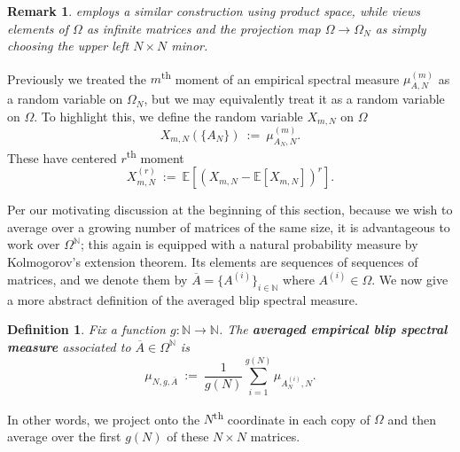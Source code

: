 \documentclass[11pt,reqno]{amsart}
\newcommand{\fix}[1]{\textcolor{red}{\textbf{ (#1)\normalsize}}}
\numberwithin{equation}{section}
\newtheorem{defi}[thm]{Definition}
\theoremstyle{plain}
\newtheorem{rem}[thm]{Remark}
\newcommand{\N}{\mathbb{N}}
\newcommand{\E}[1]{\mathbb{E}[#1]}
\begin{document}
\begin{rem}
\cite{Block Circulant} employs a similar construction using product space, while \cite{Toeplitz} views elements of $\Omega$ as infinite matrices and the projection map $\Omega \rightarrow \Omega_N$ as simply choosing the upper left $N \times N$ minor.
\end{rem}

Previously we treated the $m$\textsuperscript{th} moment of an empirical spectral measure $\mu_{A,N}^{(m)}$ as a random variable on $\Omega_N$, but we may equivalently treat it as a random variable on $\Omega$. To highlight this, we define the random variable $X_{m,N}$ on $\Omega$
\begin{equation}\label{eq_xmn}
X_{m,N}(\{A_N\})\ :=\ \mu_{A_N,N}^{(m)}.
\end{equation}
These have centered $r$\textsuperscript{th} moment
\begin{equation}
X_{m,N}^{(r)}\ :=\ \E{(X_{m,N}-\E{X_{m,N}})^r}.
\end{equation}

Per our motivating discussion at the beginning of this section, because we wish to average over a growing number of matrices of the same size, it is advantageous to work over $\Omega^\N$; this again is equipped with a natural probability measure by Kolmogorov's extension theorem. Its elements are sequences of sequences of matrices, and we denote them by $\overline{A}=\{A^{(i)}\}_{i \in \N}$ where $A^{(i)} \in \Omega$. We now give a more abstract definition of the averaged blip spectral measure.

\begin{defi}\label{def_average_blip_measure}
Fix a function $g: \N \rightarrow \N$. The \textbf{averaged empirical blip spectral measure} associated to $\overline{A} \in \Omega^\N$ is
\begin{equation}
\mu_{N,g,\overline{A}}\ :=\ \frac{1}{g(N)}\sum_{i=1}^{g(N)} \mu_{A_N^{(i)},N}.
\end{equation}
\end{defi}

In other words, we project onto the $N$\textsuperscript{th} coordinate in each copy of $\Omega$ and then average over the first $g(N)$ of these $N \times N$ matrices.
\end{document}
